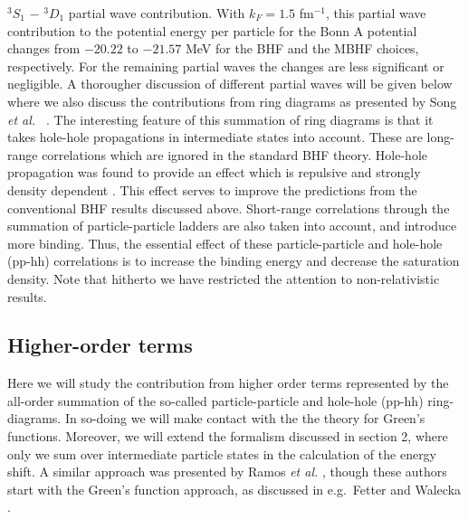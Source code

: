 $^{3}S_1$ $-$  $^{3}D_1 $ partial wave contribution.
With $k_F = 1.5$ fm$^{-1}$, this
partial wave contribution to the potential energy per particle
for the Bonn A potential changes from $-20.22$ to $-21.57$
MeV for the BHF
and the MBHF choices, respectively. For the remaining
partial waves
the changes are less significant or negligible. A thorougher discussion
of different partial waves will be given below where we also discuss
the contributions from ring diagrams as presented by
Song {\em et al.\ } \cite{shk87}.
The interesting feature of this summation of ring diagrams
is that it takes hole-hole propagations in intermediate states
into account. These are long-range correlations which are
ignored in the standard BHF theory. Hole-hole propagation
was found to provide an effect which is repulsive and
strongly density dependent \cite{rpd89}. This effect serves
to improve the predictions from the conventional BHF results
discussed above. Short-range correlations through the summation
of particle-particle ladders are also taken into account, and
introduce more binding. Thus, the essential effect of these
particle-particle and hole-hole (pp-hh) correlations is
to increase the binding energy and decrease the saturation
density. Note that hitherto we have restricted the attention
to non-relativistic results.




\subsection{Higher-order terms}

Here we will study the contribution from higher order
terms represented by the all-order summation of the
so-called particle-particle
and hole-hole (pp-hh) ring-diagrams. In so-doing we will make
contact with the the theory for Green's functions. Moreover, we will
extend the formalism discussed in section 2, where only we sum over
intermediate particle states in the calculation of the energy shift.
A similar approach was presented by Ramos {\em et al.} \cite{rpd89},
though these authors start with the Green's function approach, as
discussed in e.g.\ Fetter and Walecka \cite{fw71}.

